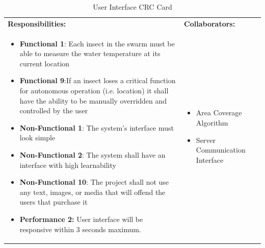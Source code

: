 \documentclass[11pt]{article}
\begin{document}
\begin{table}[H]
\centering
\label{my-label}
\begin{tabular}{ | >{\raggedright\arraybackslash}p{} | >{\raggedright\arraybackslash}p{} | }
\hline
\multicolumn{2}{|c|}{\textbf{HydroSwarm}}             \\ \hline
\textbf{Responsibilities:} & \textbf{Collaborators:} \\ \hline
\begin{itemize}
\item \textbf{Functional 1}: Each insect in the swarm must be able to measure the water temperature at its current location
\item \textbf{Functional 9}:If an insect loses a critical function for autonomous operation (i.e. location) it shall have the ability to be manually overridden and controlled by the user
\item \textbf{Non-Functional 1}: The system’s interface must look simple
\item \textbf{Non-Functional 2}: The system shall have an interface with high learnability
\item \textbf{Non-Functional 10}: The project shall not use any text, images, or media that will offend the users that purchase it
\item \textbf{Performance 2:} User interface will be responsive within 3 seconds maximum. 
\end{itemize}
&
\begin{itemize}
\item Area Coverage Algorithm
\item Server Communication Interface
\end{itemize} \\ \hline
\end{tabular}
\caption{User Interface CRC Card}
\end{table}
\end{document}
